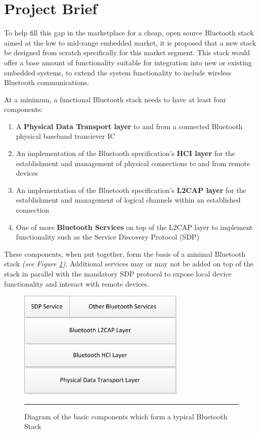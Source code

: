 \section{Project Brief}

To help fill this gap in the marketplace for a cheap, open source Bluetooth stack aimed at the low to mid-range embedded market, it is proposed that a new stack be designed from scratch specifically for this market segment. This stack would offer a base amount of functionality suitable for integration into new or existing embedded systems, to extend the system functionality to include wireless Bluetooth communications.

At a minimum, a functional Bluetooth stack needs to have at least four components:

\begin{enumerate}
	\item A \textbf{Physical Data Transport layer} to and from a connected Bluetooth physical baseband tranciever IC
	\item An implementation of the Bluetooth specification's \textbf{HCI layer} for the establishment and management of physical connections to and from remote devices
	\item An implementation of the Bluetooth specification's \textbf{L2CAP layer} for the establishment and management of logical channels within an established connection
	\item One of more \textbf{Bluetooth Services} on top of the L2CAP layer to implement functionality such as the Service Discovery Protocol (SDP)
\end{enumerate}

These components, when put together, form the basis of a minimal Bluetooth stack \emph{(see Figure \ref{fig:btstack})}. Additional services may or may not be added on top of the stack in parallel with the mandatory SDP protocol to expose local device functionality and interact with remote devices.

\begin{figure}[h]
	\centering
		\includegraphics[width=80mm]{./Figures/BluetoothStack.png}
	\rule{35em}{0.5pt}
	\caption[Diagram of a typical Bluetooth Stack]{Diagram of the basic components which form a typical Bluetooth Stack}
	\label{fig:btstack}
\end{figure}

